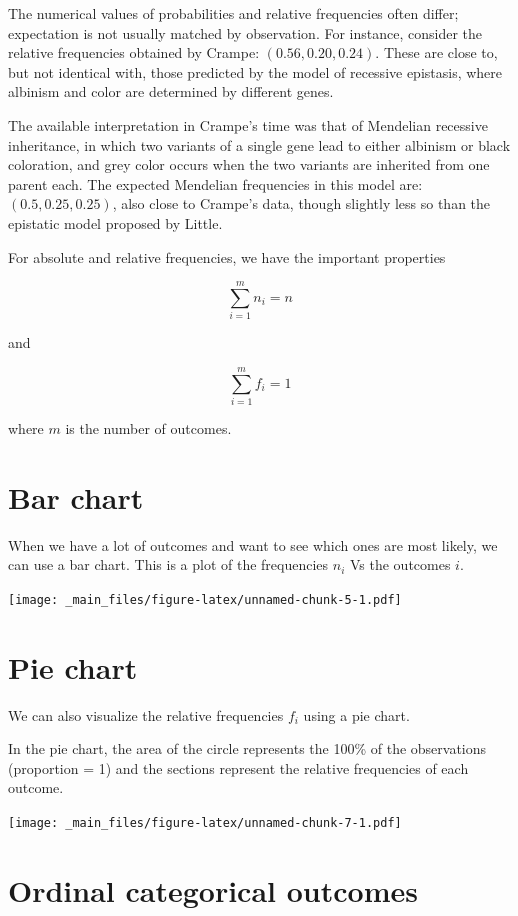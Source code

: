 \documentclass[
]{book}
\begin{document}
The numerical values of probabilities and relative frequencies often differ; expectation is not usually matched by observation. For instance, consider the relative frequencies obtained by Crampe: \((0.56, 0.20, 0.24)\). These are close to, but not identical with, those predicted by the model of recessive epistasis, where albinism and color are determined by different genes.

The available interpretation in Crampe's time was that of Mendelian recessive inheritance, in which two variants of a single gene lead to either albinism or black coloration, and grey color occurs when the two variants are inherited from one parent each. The expected Mendelian frequencies in this model are: \((0.5, 0.25, 0.25)\), also close to Crampe's data, though slightly less so than the epistatic model proposed by Little.

For absolute and relative frequencies, we have the important properties

\[\sum_{i=1}^m n_i = n\]

and

\[\sum_{i=1}^m f_i = 1\]

where \(m\) is the number of outcomes.

\hypertarget{bar-chart}{%
\section{Bar chart}\label{bar-chart}}

When we have a lot of outcomes and want to see which ones are most likely, we can use a bar chart. This is a plot of the frequencies \(n_i\) Vs the outcomes \(i\).

\texttt{[image: \_main\_files/figure-latex/unnamed-chunk-5-1.pdf]}

\hypertarget{pie-chart}{%
\section{Pie chart}\label{pie-chart}}

We can also visualize the relative frequencies \(f_i\) using a pie chart.

In the pie chart, the area of the circle represents the 100\% of the observations (proportion = 1) and the sections represent the relative frequencies of each outcome.

\texttt{[image: \_main\_files/figure-latex/unnamed-chunk-7-1.pdf]}

\hypertarget{ordinal-categorical-outcomes}{%
\section{Ordinal categorical outcomes}\label{ordinal-categorical-outcomes}}
\end{document}
